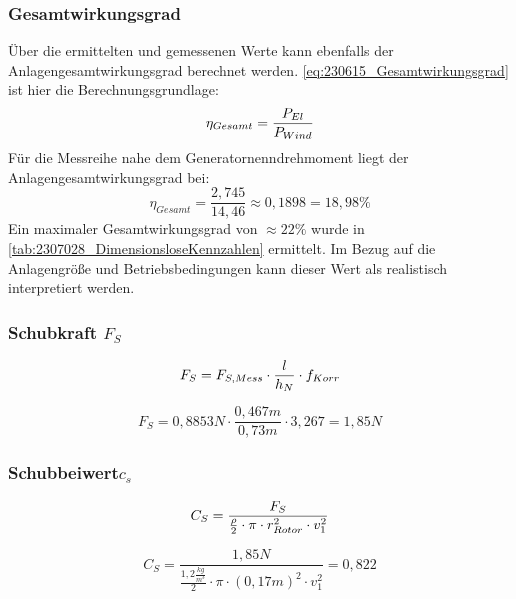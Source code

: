 \subsubsection*{Gesamtwirkungsgrad}
Über die ermittelten und gemessenen Werte kann ebenfalls der Anlagengesamtwirkungsgrad berechnet werden.
\autoref{eq:230615_Gesamtwirkungsgrad} ist hier die Berechnungsgrundlage:
\begin{equation}
    \centering
    \eta_{Gesamt} = \frac{P_{El}}{P_{Wind}}
    \label{eq:230615_Gesamtwirkungsgrad}
\end{equation}
Für die Messreihe nahe dem Generatornenndrehmoment liegt der Anlagengesamtwirkungsgrad bei:
$$\eta_{Gesamt} = \frac{2,745}{14,46}\approx 0,1898 = 18,98\%$$
Ein maximaler Gesamtwirkungsgrad von $\approx 22\%$ wurde in \autoref{tab:2307028_DimensionsloseKennzahlen} ermittelt.
Im Bezug auf die Anlagengröße und Betriebsbedingungen kann dieser Wert als realistisch interpretiert werden.
\subsubsection*{Schubkraft $F_S$}
\begin{equation}
    \centering
    F_S = F_{S,Mess} \cdot \frac{l}{h_N} \cdot f_{Korr}
    \label{eq:230615_Schubkraft}
\end{equation}

$$F_S = 0,8853N \cdot \frac{0,467m}{0,73m} \cdot 3,267 = 1,85N$$
\subsubsection*{Schubbeiwert$c_s$}
\begin{equation}
    \centering
    C_S = \frac{F_S}{\frac{\rho}{2} \cdot \pi \cdot r_{Rotor}^2 \cdot v_1^2}
    \label{eq:230615_Schubbeiwert}
\end{equation}

$$C_S = \frac{1,85N}{\frac{1,2 \frac{kg}{m^3}}{2} \cdot \pi \cdot (0,17 m)^2 \cdot v_1^2} = 0,822$$

